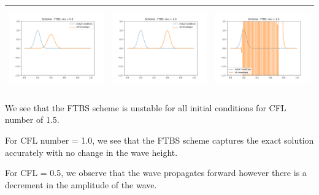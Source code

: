 \documentclass[a4paper,twoside,11pt]{article}
\begin{document}
\begin{table}[!h]
\begin{tabular}{ | c | m{5cm} | m{5cm} | }
\begin{minipage}{.3\textwidth}
            \includegraphics[width=\linewidth, height=3.5cm]{../plots/scheme3-IC5-mu0_5.png}
          \end{minipage}
          &
          \begin{minipage}{.3\textwidth}
            \includegraphics[width=\linewidth, height=3.5cm]{../plots/scheme3-IC5-mu1_0.png}
          \end{minipage}
          &
          \begin{minipage}{.3\textwidth}
            \includegraphics[width=\linewidth, height=3.5cm]{../plots/scheme3-IC5-mu1_5.png}
          \end{minipage} \\
          \hline
        \end{tabular}
      \end{table}

    We see that the FTBS scheme is unstable for all initial conditions for CFL number of 1.5.

    For CFL number = 1.0, we see that the FTBS scheme captures the exact solution accurately with no change in the wave height.

    For CFL = 0.5, we observe that the wave propagates forward however there is a decrement in the amplitude of the wave.

      \newpage
\end{document}
